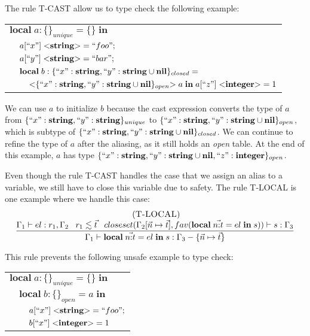 The rule \textsc{T-CAST} allow us to type check the following example:
\begin{center}
\begin{tabular}{lll}
\multicolumn{3}{l}{$\mathbf{local} \; a:\{\}_{unique} = \{ \} \; \mathbf{in}$}\\
& \multicolumn{2}{l}{$a[``x"] \; {<}\mathbf{string}{>} = ``foo";$}\\
& \multicolumn{2}{l}{$a[``y"] \; {<}\mathbf{string}{>} = ``bar";$}\\
& \multicolumn{2}{l}{$\mathbf{local} \; b:\{``x":\mathbf{string}, ``y":\mathbf{string} \cup \mathbf{nil} \}_{closed} =$}\\
& & \multicolumn{1}{l}{${<}\{``x":\mathbf{string}, ``y":\mathbf{string} \cup \mathbf{nil}\}_{open}{>} \; a \; \mathbf{in} \; a[``z"] \; {<}\mathbf{integer}{>} = 1$}
\end{tabular}
\end{center}

We can use $a$ to initialize $b$ because the cast expression converts
the type of $a$ from $\{``x":\mathbf{string}, ``y":\mathbf{string}\}_{unique}$ to
$\{``x":\mathbf{string}, ``y":\mathbf{string} \cup \mathbf{nil}\}_{open}$, which is subtype of
$\{``x":\mathbf{string}, ``y":\mathbf{string} \cup \mathbf{nil}\}_{closed}$.
We can continue to refine the type of $a$ after the aliasing,
as it still holds an \emph{open} table.
At the end of this example, $a$ has type
$\{``x":\mathbf{string}, ``y":\mathbf{string} \cup \mathbf{nil}, ``z":\mathbf{integer}\}_{open}$.

Even though the rule \textsc{T-CAST} handles the case that we assign
an alias to a variable, we still have to close this variable due to
safety.
The rule \textsc{T-LOCAL} is one example where we handle this case:
\[
\begin{array}{c}
\; (\textsc{T-LOCAL})\\
\dfrac{\Gamma_{1} \vdash el:r_{1}, \Gamma_{2} \;\;\;
       r_{1} \lesssim \vec{t} \;\;\;
       closeset(\Gamma_{2}[\vec{n} \mapsto \vec{t}], fav(\mathbf{local} \; \vec{n{:}t} = el \; \mathbf{in} \; s)) \vdash s:\Gamma_{3}}
      {\Gamma_{1} \vdash \mathbf{local} \; \vec{n{:}t} = el \; \mathbf{in} \; s:\Gamma_{3} - \{\vec{n} \mapsto \vec{t}\}}
\end{array}
\]

This rule prevents the following unsafe example to type check:
\begin{center}
\begin{tabular}{lll}
\multicolumn{3}{l}{$\mathbf{local} \; a:\{\}_{unique} = \{\} \; \mathbf{in}$}\\
& \multicolumn{2}{l}{$\mathbf{local} \; b:\{\}_{open} = a \; \mathbf{in}$}\\
& & \multicolumn{1}{l}{$a[``x"] \; {<}\mathbf{string}{>} = ``foo";$}\\
& & \multicolumn{1}{l}{$b[``x"] \; {<}\mathbf{integer}{>} = 1$}\\
\end{tabular}
\end{center}

